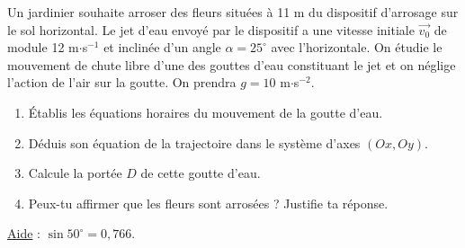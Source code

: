 \documentclass[11pt]{article}
\begin{document}
\begin{minipage}{0.58\linewidth}
Un jardinier souhaite arroser des fleurs situées à 11 m du dispositif d'arrosage sur le sol horizontal. Le jet d'eau envoyé par le dispositif a une vitesse initiale $\vec{v_0}$ de module 12 m$\cdot$s$^{-1}$ et inclinée d'un angle $\alpha = 25^\circ$ avec l'horizontale. On étudie le mouvement de chute libre d'une des gouttes d'eau constituant le jet et on néglige l'action de l'air sur la goutte. On prendra $g = 10$ m$\cdot$s$^{-2}$.
\end{minipage}\hfill
\begin{minipage}{0.4\linewidth}
\centering
{}
\end{minipage}

\begin{enumerate}
  \item Établis les équations horaires du mouvement de la goutte d'eau.
  \item Déduis son équation de la trajectoire dans le système d'axes $(Ox, Oy)$.
  \item Calcule la portée $D$ de cette goutte d'eau.
  \item Peux-tu affirmer que les fleurs sont arrosées ? Justifie ta réponse.
\end{enumerate}
\noindent \underline{Aide} : $\sin 50^\circ = 0{,}766$.
\end{document}
